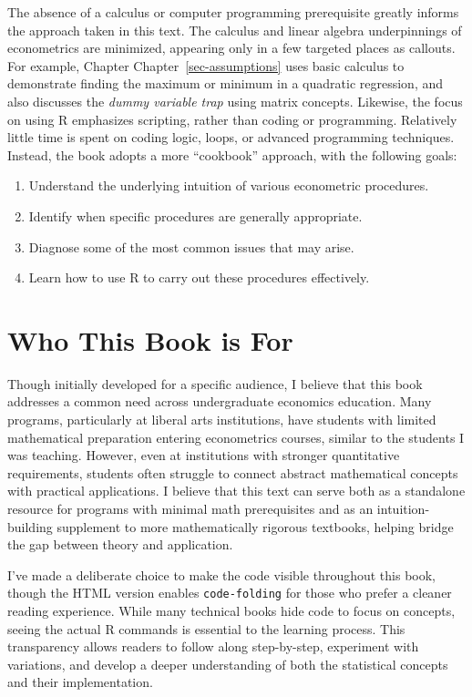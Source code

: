 \documentclass[
  letterpaper,
]{book}
\begin{document}
The absence of a calculus or computer programming prerequisite greatly
informs the approach taken in this text. The calculus and linear algebra
underpinnings of econometrics are minimized, appearing only in a few
targeted places as callouts. For example, Chapter
Chapter~\ref{sec-assumptions} uses basic calculus to demonstrate finding
the maximum or minimum in a quadratic regression, and also discusses the
\emph{dummy variable trap} using matrix concepts. Likewise, the focus on
using R emphasizes scripting, rather than coding or programming.
Relatively little time is spent on coding logic, loops, or advanced
programming techniques. Instead, the book adopts a more ``cookbook''
approach, with the following goals:

\begin{enumerate}
\def\labelenumi{\arabic{enumi}.}
\item
  Understand the underlying intuition of various econometric procedures.
\item
  Identify when specific procedures are generally appropriate.
\item
  Diagnose some of the most common issues that may arise.
\item
  Learn how to use R to carry out these procedures effectively.
\end{enumerate}

\section*{Who This Book is For}\label{who-this-book-is-for}


Though initially developed for a specific audience, I believe that this
book addresses a common need across undergraduate economics education.
Many programs, particularly at liberal arts institutions, have students
with limited mathematical preparation entering econometrics courses,
similar to the students I was teaching. However, even at institutions
with stronger quantitative requirements, students often struggle to
connect abstract mathematical concepts with practical applications. I
believe that this text can serve both as a standalone resource for
programs with minimal math prerequisites and as an intuition-building
supplement to more mathematically rigorous textbooks, helping bridge the
gap between theory and application.

I've made a deliberate choice to make the code visible throughout this
book, though the HTML version enables \texttt{code-folding} for those
who prefer a cleaner reading experience. While many technical books hide
code to focus on concepts, seeing the actual R commands is essential to
the learning process. This transparency allows readers to follow along
step-by-step, experiment with variations, and develop a deeper
understanding of both the statistical concepts and their implementation.
\end{document}
